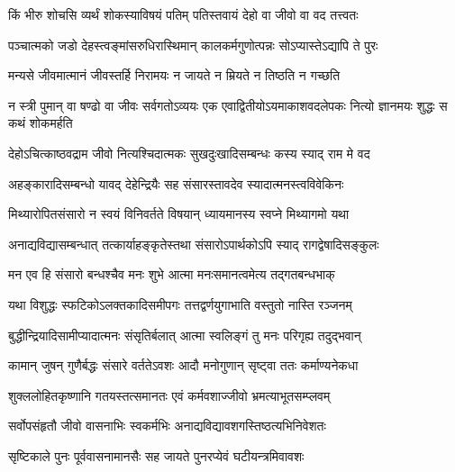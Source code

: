 


\addtocounter{shlokacount}{12}

\twolineshloka
{किं भीरु शोचसि व्यर्थं शोकस्याविषयं पतिम्}
{पतिस्तवायं देहो वा जीवो वा वद तत्त्वतः} %

\twolineshloka
{पञ्चात्मको जडो देहस्त्वङ्मांसरुधिरास्थिमान्}
{कालकर्मगुणोत्पन्नः सोऽप्यास्तेऽद्यापि ते पुरः} %

\twolineshloka
{मन्यसे जीवमात्मानं जीवस्तर्हि निरामयः}
{न जायते न म्रियते न तिष्ठति न गच्छति} %

\threelineshloka
{न स्त्री पुमान् वा षण्ढो वा जीवः सर्वगतोऽव्ययः}
{एक एवाद्वितीयोऽयमाकाशवदलेपकः}
{नित्यो ज्ञानमयः शुद्धः स कथं शोकमर्हति} %


\twolineshloka
{देहोऽचित्काष्ठवद्राम जीवो नित्यश्चिदात्मकः}
{सुखदुःखादिसम्बन्धः कस्य स्याद् राम मे वद} %


\twolineshloka
{अहङ्कारादिसम्बन्धो यावद् देहेन्द्रियैः सह}
{संसारस्तावदेव स्यादात्मनस्त्वविवेकिनः} %

\twolineshloka
{मिथ्यारोपितसंसारो न स्वयं विनिवर्तते}
{विषयान् ध्यायमानस्य स्वप्ने मिथ्यागमो यथा} %

\twolineshloka
{अनाद्यविद्यासम्बन्धात् तत्कार्याहङ्कृतेस्तथा}
{संसारोऽपार्थकोऽपि स्याद् रागद्वेषादिसङ्कुलः} %

\twolineshloka
{मन एव हि संसारो बन्धश्चैव मनः शुभे}
{आत्मा मनःसमानत्वमेत्य तद्गतबन्धभाक्} %

\twolineshloka
{यथा विशुद्धः स्फटिकोऽलक्तकादिसमीपगः}
{तत्तद्वर्णयुगाभाति वस्तुतो नास्ति रञ्जनम्} %

\twolineshloka
{बुद्धीन्द्रियादिसामीप्यादात्मनः संसृतिर्बलात्}
{आत्मा स्वलिङ्गं तु मनः परिगृह्य तदुद्भवान्} %

\twolineshloka
{कामान् जुषन् गुणैर्बद्धः संसारे वर्ततेऽवशः}
{आदौ मनोगुणान् सृष्ट्वा ततः कर्माण्यनेकधा} %

\twolineshloka
{शुक्ललोहितकृष्णानि गतयस्तत्समानतः}
{एवं कर्मवशाज्जीवो भ्रमत्याभूतसम्प्लवम्} %

\twolineshloka
{सर्वोपसंहृतौ जीवो वासनाभिः स्वकर्मभिः}
{अनाद्यविद्यावशगस्तिष्ठत्यभिनिवेशतः} %

\twolineshloka
{सृष्टिकाले पुनः पूर्ववासनामानसैः सह}
{जायते पुनरप्येवं घटीयन्त्रमिवावशः} %


